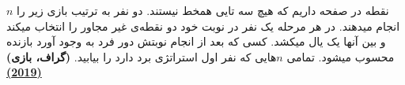 $n$ نقطه در صفحه داریم که هیچ سه تایی همخط نیستند.
دو نفر به ترتیب بازی زیر را انجام میدهند. در هر مرحله یک نفر در نوبت خود دو نقطه‌ی غیر مجاور را انتخاب میکند و بین آنها یک یال میکشد.
کسی که بعد از انجام نوبتش دور فرد به وجود آورد بازنده محسوب میشود. تمامی $n$هایی که نفر اول استراتژی برد دارد را بیابید.
\textbf{(گراف، بازی)}
\href{https://artofproblemsolving.com/community/c6h1812972p12085177}{\textbf{(2019)}}